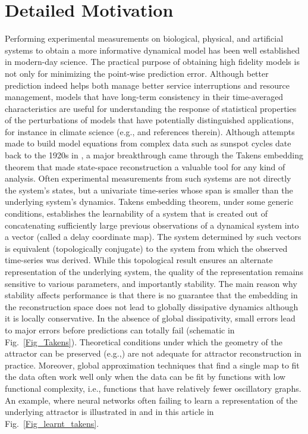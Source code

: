 \documentclass[12 pt]{article}
\begin{document}
\section{Detailed Motivation}
Performing experimental measurements 
on  biological, physical, and artificial systems to obtain 
a more informative dynamical model has been well established in modern-day science. The practical purpose of obtaining high fidelity models is not only for minimizing the point-wise prediction error. Although better prediction indeed helps both manage better service interruptions and resource management, models that have long-term consistency  in their time-averaged characteristics
are useful for understanding the response of statistical properties of the perturbations of models that have potentially distinguished applications, for instance in climate science (e.g., \cite{majda2010high,ghil2020physics} and references therein). 
Although attempts made to build model equations from complex data such as sunspot cycles date back to the 1920s in \cite{yule1927vii}, a major breakthrough came through the Takens embedding theorem \cite{takens1981detecting} that
made state-space reconstruction a valuable tool for any kind of analysis.  Often experimental measurements from such systems are not directly the system's states, but a univariate time-series whose span is smaller than the underlying system's dynamics.  Takens embedding theorem, under some generic conditions,  establishes the learnability of a system that is created out of concatenating sufficiently large previous observations of a dynamical system into a vector (called a delay coordinate map). The system determined by such vectors is equivalent (topologically conjugate) to the system from which the observed time-series was derived.  While this topological result ensures an alternate representation of the underlying system, the quality of the representation remains sensitive to various parameters, and importantly stability. The main reason why stability affects performance is that there is no guarantee that the embedding in the reconstruction space does  not lead to globally dissipative dynamics although it is locally conservative. In the absence of global dissipativity, small errors lead to major errors before predictions can totally fail (schematic in Fig.~\ref{Fig_Takens}). 
Theoretical conditions under which the geometry of the attractor can be preserved (e.g.,\cite{eftekhari2018stabilizing}) are not adequate for attractor reconstruction in practice.
Moreover, global approximation techniques that find a single map to fit the data often work well only when the data can be fit by functions with low functional complexity, i.e., functions that have relatively fewer oscillatory graphs. An example, where neural networks often failing to learn a representation of the underlying attractor   is illustrated in   \cite{principe1992prediction} and in this article in Fig.~\ref{Fig_learnt_takens}. 
\end{document}
